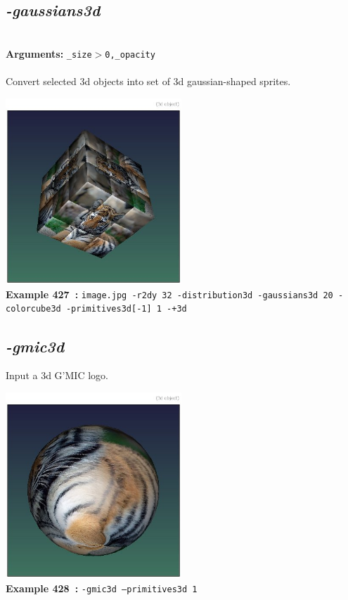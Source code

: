 \documentclass[a4paper,11pt,twoside]{book}
\begin{document}
\subsection{\emph{-gaussians3d} }\vspace*{-0.5em}
~\\\textbf{Arguments: } 
{\small \texttt{\_size$>$0,\_opacity}}\\~\\
Convert selected 3d objects into set of 3d gaussian-shaped sprites.
\begin{center}\includegraphics[keepaspectratio=true,height=7cm,width=\textwidth]{img/gmic_def427.jpg}\\
{\footnotesize \textbf{Example 427~:} \texttt{image.jpg -r2dy 32 -distribution3d -gaussians3d 20 -colorcube3d -primitives3d[-1] 1 -+3d}}
\end{center}

\subsection{\emph{-gmic3d} }\vspace*{-0.5em}
Input a 3d G'MIC logo.
\begin{center}\includegraphics[keepaspectratio=true,height=7cm,width=\textwidth]{img/gmic_def428.jpg}\\
{\footnotesize \textbf{Example 428~:} \texttt{-gmic3d --primitives3d 1}}
\end{center}
\end{document}
